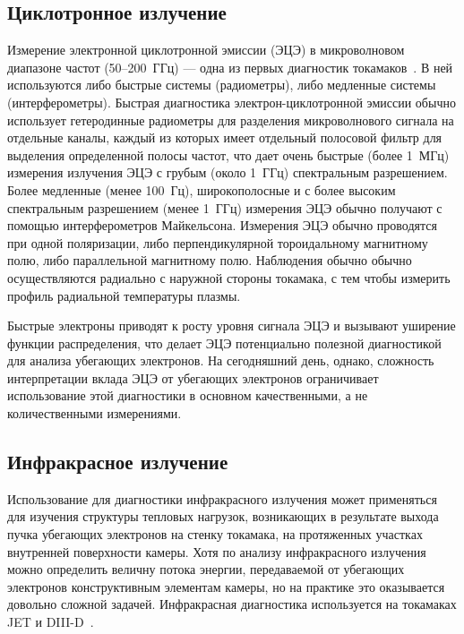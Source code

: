 
\subsection{Циклотронное излучение}

Измерение электронной циклотронной эмиссии (ЭЦЭ) в микроволновом диапазоне частот (50--200~ГГц) --- одна из первых диагностик токамаков~\cite{Costley1974}. В ней используются либо быстрые системы (радиометры), либо медленные системы (интерферометры). Быстрая диагностика электрон-циклотронной эмиссии обычно использует гетеродинные радиометры для разделения микроволнового сигнала на отдельные каналы, каждый из которых имеет отдельный полосовой фильтр для выделения определенной полосы частот, что дает очень быстрые (более 1~МГц) измерения излучения ЭЦЭ с грубым (около 1~ГГц) спектральным разрешением. Более медленные (менее 100~Гц), широкополосные и с более высоким спектральным разрешением (менее 1~ГГц) измерения ЭЦЭ обычно получают с помощью интерферометров Майкельсона. Измерения ЭЦЭ обычно проводятся при одной поляризации, либо перпендикулярной тороидальному магнитному полю, либо параллельной магнитному полю. Наблюдения обычно обычно осуществляются радиально с наружной стороны токамака, с тем чтобы измерить профиль радиальной температуры плазмы.~\cite{Breizman2019}

Быстрые электроны приводят к росту уровня сигнала ЭЦЭ и вызывают уширение функции распределения, что делает ЭЦЭ потенциально полезной диагностикой для анализа убегающих электронов. На сегодняшний день, однако, сложность интерпретации вклада ЭЦЭ от убегающих электронов ограничивает использование этой диагностики в основном качественными, а не количественными измерениями.~\cite{Breizman2019} 


\subsection{ Инфракрасное излучение }

Использование для диагностики инфракрасного излучения может применяться для изучения структуры тепловых нагрузок, возникающих в результате выхода пучка убегающих электронов на стенку токамака, на протяженных участках внутренней поверхности камеры. Хотя по анализу инфракрасного излучения можно определить величну потока энергии, передаваемой от убегающих электронов конструктивным элементам камеры, но на практике это оказывается довольно сложной задачей. Инфракрасная диагностика используется на токамаках JET и DIII-D~\cite{Breizman2019,Lehnen2009,Hollmann2017}.

